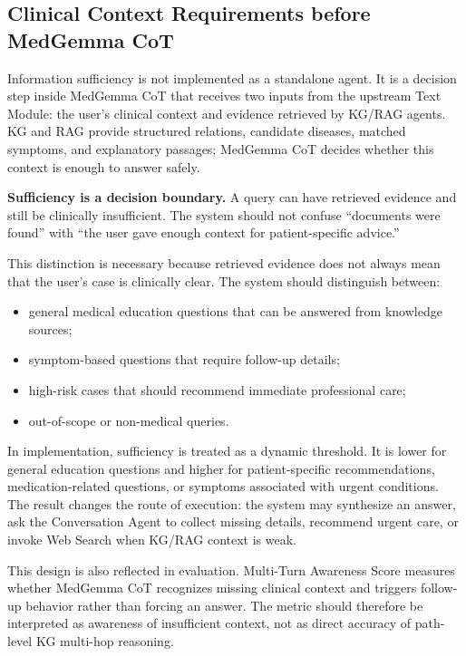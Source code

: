 \subsection{Clinical Context Requirements before MedGemma CoT}

Information sufficiency is not implemented as a standalone agent. It is a decision step inside MedGemma CoT that receives two inputs from the upstream Text Module: the user's clinical context and evidence retrieved by KG/RAG agents. KG and RAG provide structured relations, candidate diseases, matched symptoms, and explanatory passages; MedGemma CoT decides whether this context is enough to answer safely.

\textbf{Sufficiency is a decision boundary.} A query can have retrieved evidence and still be clinically insufficient. The system should not confuse ``documents were found'' with ``the user gave enough context for patient-specific advice.''

This distinction is necessary because retrieved evidence does not always mean that the user's case is clinically clear. The system should distinguish between:

\begin{itemize}
    \item general medical education questions that can be answered from knowledge sources;
    \item symptom-based questions that require follow-up details;
    \item high-risk cases that should recommend immediate professional care;
    \item out-of-scope or non-medical queries.
\end{itemize}

In implementation, sufficiency is treated as a dynamic threshold. It is lower for general education questions and higher for patient-specific recommendations, medication-related questions, or symptoms associated with urgent conditions. The result changes the route of execution: the system may synthesize an answer, ask the Conversation Agent to collect missing details, recommend urgent care, or invoke Web Search when KG/RAG context is weak.

This design is also reflected in evaluation. Multi-Turn Awareness Score measures whether MedGemma CoT recognizes missing clinical context and triggers follow-up behavior rather than forcing an answer. The metric should therefore be interpreted as awareness of insufficient context, not as direct accuracy of path-level KG multi-hop reasoning.

